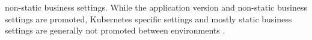 non-static business settings.
While the application version and non-static business settings are promoted,
Kubernetes specific settings and mostly static business settings are generally not promoted between environments
\autocite{codefreshHowToModelGitOpsEnvironmentsAndPromote}.
%
%
%
%










